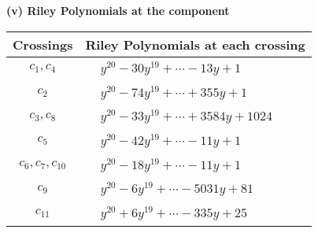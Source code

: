 \documentclass[1p]{elsarticle_modified}
\theoremstyle{definition}
\begin{document}
\newpage\renewcommand{\arraystretch}{1}
\flushleft \textbf{(v) Riley Polynomials at the component}\newline \\
\begin{tabular}{m{50pt}|m{274pt}}
Crossings & \hspace{64pt}Riley Polynomials at each crossing \\
\hline $$\begin{aligned}c_{1},c_{4}\end{aligned}$$&$\begin{aligned}
&y^{20}-30 y^{19}+\cdots-13 y+1
\end{aligned}$\\
\hline $$\begin{aligned}c_{2}\end{aligned}$$&$\begin{aligned}
&y^{20}-74 y^{19}+\cdots+355 y+1
\end{aligned}$\\
\hline $$\begin{aligned}c_{3},c_{8}\end{aligned}$$&$\begin{aligned}
&y^{20}-33 y^{19}+\cdots+3584 y+1024
\end{aligned}$\\
\hline $$\begin{aligned}c_{5}\end{aligned}$$&$\begin{aligned}
&y^{20}-42 y^{19}+\cdots-11 y+1
\end{aligned}$\\
\hline $$\begin{aligned}c_{6},c_{7},c_{10}\end{aligned}$$&$\begin{aligned}
&y^{20}-18 y^{19}+\cdots-11 y+1
\end{aligned}$\\
\hline $$\begin{aligned}c_{9}\end{aligned}$$&$\begin{aligned}
&y^{20}-6 y^{19}+\cdots-5031 y+81
\end{aligned}$\\
\hline $$\begin{aligned}c_{11}\end{aligned}$$&$\begin{aligned}
&y^{20}+6 y^{19}+\cdots-335 y+25
\end{aligned}$\\
\hline
\end{tabular}\\~\\
\end{document}
